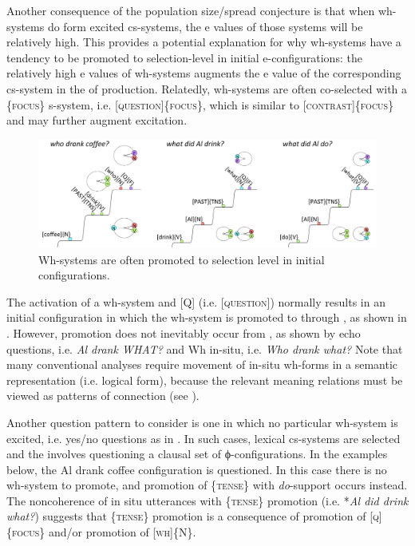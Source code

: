   Another consequence of the population size/spread conjecture is that when wh-systems do form excited cs-systems, the e values of those systems will be relatively high. This provides a potential explanation for why wh-systems have a tendency to be promoted to selection-level in initial e-configurations: the relatively high e values of wh-systems augments the e value of the corresponding cs-system in the  of production. Relatedly, wh-systems are often co-selected with a \{\textsc{focus}\} s-system, i.e. [\textsc{question}]\{\textsc{focus}\}, which is similar to [\textsc{contrast}]\{\textsc{focus}\} and may further augment excitation.

  
\begin{figure}
\includegraphics[width=\textwidth]{figures/Tilsen-img159.png}
\caption{Wh-systems are often promoted to selection level in initial configurations.}
\label{fig:7:15}
\end{figure}
 

  The activation of a wh-system and [Q] (i.e. [\textsc{question}]) normally results in an initial configuration in which the wh-system is promoted to  through , as shown in {}. However, promotion does not inevitably occur from , as shown by echo questions, i.e. \textit{Al drank WHAT?} and Wh in-situ, i.e. \textit{Who drank what?} Note that many conventional analyses require movement of in-situ wh-forms in a semantic representation (i.e. logical form), because the relevant meaning relations must be viewed as patterns of connection (see \citealt{Reinhart1998,Watanabe1992}).

  Another question pattern to consider is one in which no particular wh-system is excited, i.e. yes/no questions as in {}. In such cases, lexical cs-systems are selected and the  involves questioning a clausal set of ϕ-configurations. In the examples below, the {\textbar}Al drank coffee{\textbar} configuration is questioned. In this case there is no wh-system to promote, and promotion of \{\textsc{tense}\} with \textit{do}{}-support occurs instead. The noncoherence of in situ utterances with \{\textsc{tense}\} promotion (i.e. *\textit{Al did drink what?}) suggests that \{\textsc{tense}\} promotion is a consequence of promotion of [\textsc{q}]\{\textsc{focus}\} and/or promotion of [\textsc{wh}]\{N\}. 

